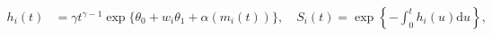 \begin{align}
  h_{i}(t) &= \gamma t^{\gamma - 1} \exp\{\theta_{0} + w_{i}\theta_{1} + \alpha(m_{i}(t))\}, \quad
  S_{i}(t) = \exp\left\{-\int_{0}^{t}h_{i}(u)\text{d}u\right\},
  \label{eqn:submodel-two-hazard-general}
\end{align}